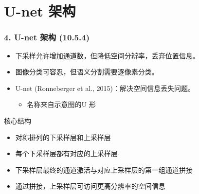 \documentclass[t,aspectratio=169]{beamer} %
\begin{document}
\section{U-net 架构}

\begin{frame}
    \frametitle{4. U-net 架构 (10.5.4)}
    \begin{itemize}
        \item 下采样允许增加通道数，但降低\alert{空间分辨率}，丢弃位置信息。
        \item 图像分类可容忍，但语义分割\alert{需要逐像素分类}。
        \item \alert{U-net} (Ronneberger et al., 2015)：解决空间信息丢失问题。
        \begin{itemize}
            \item 名称来自示意图的\alert{U 形}
        \end{itemize}
    \end{itemize}
    \begin{block}{核心结构}
        \begin{itemize}
            \item 对称排列的下采样层和上采样层
            \item 每个下采样层都有对应的上采样层
            \item 下采样层最终的通道激活与对应上采样层的\alert{第一组通道拼接}
            \item 通过拼接，上采样层可访问\alert{更高分辨率的空间信息}
        \end{itemize}
    \end{block}
\end{frame}
\end{document}
